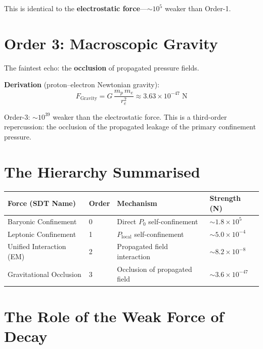 This is identical to the \textbf{electrostatic force}---$\sim 10^5$ weaker than Order-1.


\section{Order 3: Macroscopic Gravity}

The faintest echo: the \textbf{occlusion} of propagated pressure fields.

\textbf{Derivation} (proton--electron Newtonian gravity):
\begin{equation}\label{eq:F-gravity}
  F_{\text{Gravity}} = G\,\frac{m_p\,m_e}{r_e^2} \approx 3.63 \times 10^{-47}\;\text{N}
\end{equation}

Order-3: $\sim 10^{39}$ weaker than the electrostatic force.  This is a third-order repercussion: the occlusion of the propagated leakage of the primary confinement pressure.


\section{The Hierarchy Summarised}

\begin{center}
\begin{tabular}{llll}
\hline
\textbf{Force (SDT Name)} & \textbf{Order} & \textbf{Mechanism} & \textbf{Strength (N)} \\
\hline
Baryonic Confinement & 0 & Direct $P_0$ self-confinement & $\sim 1.8 \times 10^5$ \\
Leptonic Confinement & 1 & $P_{\text{local}}$ self-confinement & $\sim 5.0 \times 10^{-4}$ \\
Unified Interaction (EM) & 2 & Propagated field interaction & $\sim 8.2 \times 10^{-8}$ \\
Gravitational Occlusion & 3 & Occlusion of propagated field & $\sim 3.6 \times 10^{-47}$ \\
\hline
\end{tabular}
\end{center}


\section{The Role of the Weak Force of Decay}


